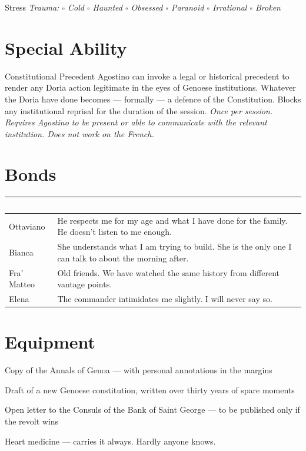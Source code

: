 \medskip
\begin{pgclockbox}{Stress \hfill {}}
\small\textit{Trauma: $\square$ Cold \quad $\square$ Haunted \quad $\square$ Obsessed \quad $\square$ Paranoid \quad $\square$ Irrational \quad $\square$ Broken}
\end{pgclockbox}

\section*{Special Ability}
\begin{doriabox}{Constitutional Precedent}
Agostino can invoke a legal or historical precedent to render any Doria action
legitimate in the eyes of Genoese institutions. Whatever the Doria have done
becomes --- formally --- a defence of the Constitution. Blocks any institutional
reprisal for the duration of the session.
\textit{Once per session. Requires Agostino to be present or able to communicate with
the relevant institution. Does not work on the French.}
\end{doriabox}

\section*{Bonds}
\begin{table}[h]\centering\renewcommand{\arraystretch}{1.4}
\begin{tabularx}{\linewidth}{@{}L{2.4cm} X@{}}
\toprule{}
\textcolor{white}{\textbf{PC}} & \textcolor{white}{\textbf{Bond}} \\
\midrule
Ottaviano & He respects me for my age and what I have done for the family. He doesn't listen to me enough. \\
Bianca & She understands what I am trying to build. She is the only one I can talk to about the morning after. \\
Fra' Matteo & Old friends. We have watched the same history from different vantage points. \\
Elena & The commander intimidates me slightly. I will never say so. \\
\bottomrule
\end{tabularx}
\end{table}

\section*{Equipment}
\begin{goldlist}
\item Copy of the Annals of Genoa --- with personal annotations in the margins
\item Draft of a new Genoese constitution, written over thirty years of spare moments
\item Open letter to the Consuls of the Bank of Saint George --- to be published only if the revolt wins
\item Heart medicine --- carries it always. Hardly anyone knows.
\end{goldlist}

